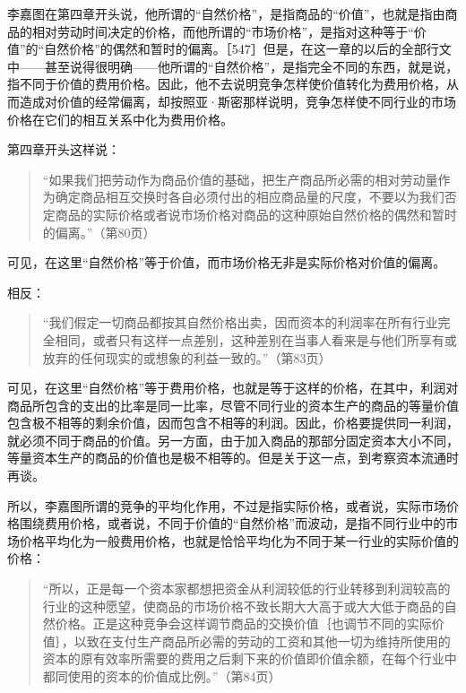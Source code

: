 
李嘉图在第四章开头说，他所谓的“自然价格”，是指商品的“价值”，也就是指由商品的相对劳动时间决定的价格，而他所谓的“市场价格”，是指对这种等于“价值”的“自然价格”的偶然和暂时的偏离。［547］但是，在这一章的以后的全部行文中——甚至说得很明确——他所谓的“自然价格”，是指完全不同的东西，就是说，指不同于价值的费用价格。因此，他不去说明竞争怎样使价值转化为费用价格，从而造成对价值的经常偏离，却按照亚·斯密那样说明，竞争怎样使不同行业的市场价格在它们的相互关系中化为费用价格。

第四章开头这样说：

\begin{quote}{“如果我们把劳动作为商品价值的基础，把生产商品所必需的相对劳动量作为确定商品相互交换时各自必须付出的相应商品量的尺度，不要以为我们否定商品的实际价格或者说市场价格对商品的这种原始自然价格的偶然和暂时的偏离。”（第80页）}\end{quote}

可见，在这里“自然价格”等于价值，而市场价格无非是实际价格对价值的偏离。

相反：

\begin{quote}{“我们假定一切商品都按其自然价格出卖，因而资本的利润率在所有行业完全相同，或者只有这样一点差别，这种差别在当事人看来是与他们所享有或放弃的任何现实的或想象的利益一致的。”（第83页）}\end{quote}

可见，在这里“自然价格”等于费用价格，也就是等于这样的价格，在其中，利润对商品所包含的支出的比率是同一比率，尽管不同行业的资本生产的商品的等量价值包含极不相等的剩余价值，因而包含不相等的利润。因此，价格要提供同一利润，就必须不同于商品的价值。另一方面，由于加入商品的那部分固定资本大小不同，等量资本生产的商品的价值也是极不相等的。但是关于这一点，到考察资本流通时再谈。

所以，李嘉图所谓的竞争的平均化作用，不过是指实际价格，或者说，实际市场价格围绕费用价格，或者说，不同于价值的“自然价格”而波动，是指不同行业中的市场价格平均化为一般费用价格，也就是恰恰平均化为不同于某一行业的实际价值的价格：

\begin{quote}{“所以，正是每一个资本家都想把资金从利润较低的行业转移到利润较高的行业的这种愿望，使商品的市场价格不致长期大大高于或大大低于商品的自然价格。正是这种竞争会这样调节商品的交换价值｛也调节不同的实际价值｝，以致在支付生产商品所必需的劳动的工资和其他一切为维持所使用的资本的原有效率所需要的费用之后剩下来的价值即价值余额，在每个行业中都同使用的资本的价值成比例。”（第84页）}\end{quote}

